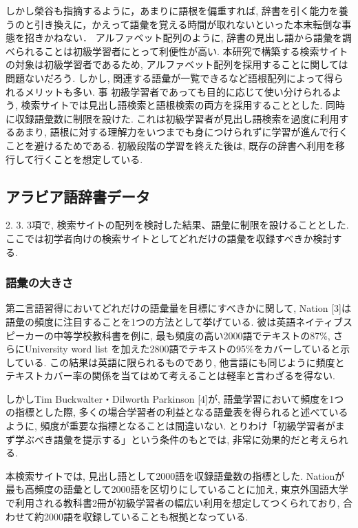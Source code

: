 \documentclass[technicalreport]{ieicej}
\begin{document}
しかし榮谷\cite{sakaedani2008}も指摘するように，あまりに語根を偏重すれば, 辞書を引く能力を養うのと引き換えに，かえって語彙を覚える時間が取れないといった本末転倒な事態を招きかねない．
アルファベット配列のように, 辞書の見出し語から語彙を調べられることは初級学習者にとって利便性が高い.
本研究で構築する検索サイトの対象は初級学習者であるため, アルファベット配列を採用することに関しては問題ないだろう.
しかし, 関連する語彙が一覧できるなど語根配列によって得られるメリットも多い. 事 初級学習者であっても目的に応じて使い分けられるよう, 検索サイトでは見出し語検索と語根検索の両方を採用することとした. 同時に収録語彙数に制限を設けた. これは初級学習者が見出し語検索を過度に利用するあまり, 語根に対する理解力をいつまでも身につけられずに学習が進んで行くことを避けるためである. 初級段階の学習を終えた後は, 既存の辞書へ利用を移行して行くことを想定している. 

\subsection{アラビア語辞書データ}
2. 3. 3項で, 検索サイトの配列を検討した結果、語彙に制限を設けることとした. ここでは初学者向けの検索サイトとしてどれだけの語彙を収録すべきか検討する.

\subsubsection{語彙の大きさ}
第二言語習得においてどれだけの語彙量を目標にすべきかに関して, Nation [3]は語彙の頻度に注目することを1つの方法として挙げている. 彼は英語ネイティブスピーカーの中等学校教科書を例に, 最も頻度の高い2000語でテキストの87\%, さらにUniversity word list を加えた2800語でテキストの95\%をカバーしていると示している. この結果は英語に限られるものであり, 他言語にも同じように頻度とテキストカバー率の関係を当てはめて考えることは軽率と言わざるを得ない. 

しかしTim Buckwalter・Dilworth Parkinson [4]が, 語彙学習において頻度を1つの指標とした際, 多くの場合学習者の利益となる語彙表を得られると述べているように, 頻度が重要な指標となることは間違いない. とりわけ「初級学習者がまず学ぶべき語彙を提示する」という条件のもとでは, 非常に効果的だと考えられる.

本検索サイトでは, 見出し語として2000語を収録語彙数の指標とした. Nationが最も高頻度の語彙として2000語を区切りにしていることに加え, 東京外国語大学で利用される教科書2冊が初級学習者の幅広い利用を想定してつくられており, 合わせて約2000語を収録していることも根拠となっている.
\end{document}

